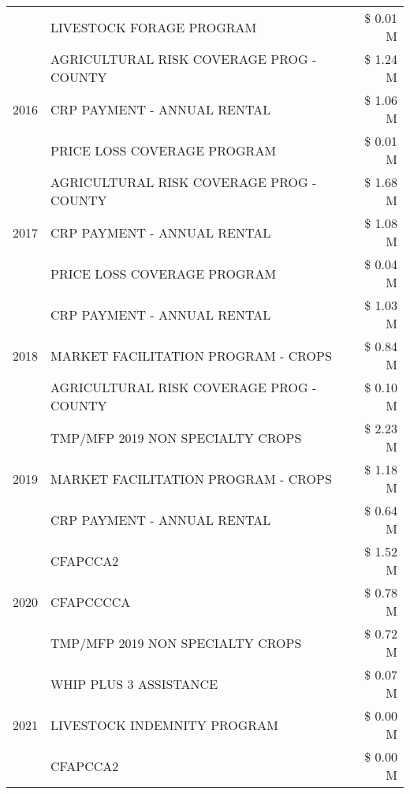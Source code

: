 \begin{tabular}{llr}
 & LIVESTOCK FORAGE PROGRAM & \$ 0.01 M \\
\cline{1-3}
\multirow[t]{3}{*}{2016} & AGRICULTURAL RISK COVERAGE PROG - COUNTY & \$ 1.24 M \\
 & CRP PAYMENT - ANNUAL RENTAL & \$ 1.06 M \\
 & PRICE LOSS COVERAGE PROGRAM & \$ 0.01 M \\
\cline{1-3}
\multirow[t]{3}{*}{2017} & AGRICULTURAL RISK COVERAGE PROG - COUNTY & \$ 1.68 M \\
 & CRP PAYMENT - ANNUAL RENTAL & \$ 1.08 M \\
 & PRICE LOSS COVERAGE PROGRAM & \$ 0.04 M \\
\cline{1-3}
\multirow[t]{3}{*}{2018} & CRP PAYMENT - ANNUAL RENTAL & \$ 1.03 M \\
 & MARKET FACILITATION PROGRAM - CROPS & \$ 0.84 M \\
 & AGRICULTURAL RISK COVERAGE PROG - COUNTY & \$ 0.10 M \\
\cline{1-3}
\multirow[t]{3}{*}{2019} & TMP/MFP 2019 NON SPECIALTY CROPS & \$ 2.23 M \\
 & MARKET FACILITATION PROGRAM - CROPS & \$ 1.18 M \\
 & CRP PAYMENT - ANNUAL RENTAL & \$ 0.64 M \\
\cline{1-3}
\multirow[t]{3}{*}{2020} & CFAPCCA2 & \$ 1.52 M \\
 & CFAPCCCCA & \$ 0.78 M \\
 & TMP/MFP 2019 NON SPECIALTY CROPS & \$ 0.72 M \\
\cline{1-3}
\multirow[t]{3}{*}{2021} & WHIP PLUS 3 ASSISTANCE & \$ 0.07 M \\
 & LIVESTOCK INDEMNITY PROGRAM & \$ 0.00 M \\
 & CFAPCCA2 & \$ 0.00 M \\
\cline{1-3}
\bottomrule
\end{tabular}
